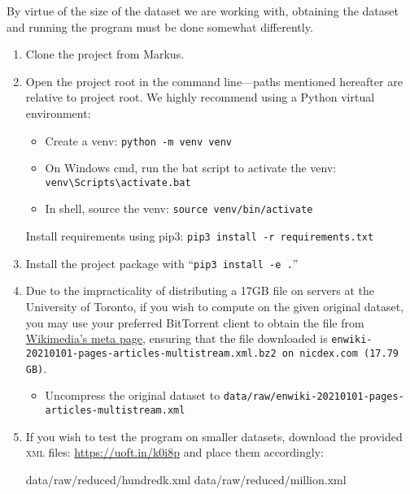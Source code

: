 \documentclass[fontsize=12pt]{article}
\newcommand{\py}[1]{\texttt{#1}}
\begin{document}
\begin{multicols}{2}
By virtue of the size of the dataset we are working with, obtaining the dataset and running the program must be done somewhat differently.

\begin{enumerate}
  \item Clone the project from Markus.
  \item Open the project root in the command line---paths mentioned hereafter are relative to project root.
        We highly recommend using a Python virtual environment:
        \begin{itemize}
          \item Create a venv: \py{python -m venv venv}
          \item On Windows cmd, run the bat script to activate the venv: \texttt{venv\textbackslash Scripts\textbackslash activate.bat}
          \item In shell, source the venv: \texttt{source venv/bin/activate}
        \end{itemize}
     Install requirements using pip3: \texttt{pip3 install -r requirements.txt}
  \item Install the project package with ``\py{pip3 install -e .}''
  \item Due to the impracticality of distributing a 17GB file on servers at the University of Toronto, if you wish to compute on the given original dataset, you may use your preferred BitTorrent client to obtain the file from \href{https://meta.wikimedia.org/wiki/Data_dump_torrents#English_Wikipedia}{Wikimedia's meta page}, ensuring that the file downloaded is \texttt{enwiki-20210101-pages-articles-multistream.xml.bz2 on nicdex.com (17.79 GB)}.
        \begin{itemize}
          \item Uncompress the original dataset to \texttt{data/raw/enwiki-20210101-pages-articles-multistream.xml}
        \end{itemize}
  \item If you wish to test the program on smaller datasets, download the provided \textsc{xml} files: \href{https://uoft.in/k0i8p}{https://uoft.in/k0i8p} and place them accordingly:

\begin{verbatim*}
data/raw/reduced/hundredk.xml
data/raw/reduced/million.xml
\end{verbatim*}


\end{enumerate}
\end{multicols}
\end{document}
